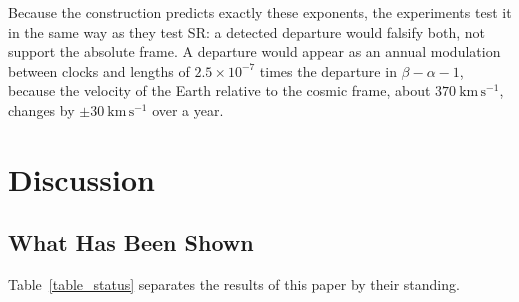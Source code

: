 \documentclass{iopjournal}
\begin{document}
Because the construction predicts exactly these exponents, the experiments test it in the same way as they test SR: a detected departure would falsify both, not support the absolute frame. A departure would appear as an annual modulation between clocks and lengths of $2.5\times10^{-7}$ times the departure in $\beta-\alpha-1$, because the velocity of the Earth relative to the cosmic frame, about $370~\mathrm{km\,s^{-1}}$, changes by $\pm30~\mathrm{km\,s^{-1}}$ over a year.

\section{Discussion}\label{sec_discussion}

\subsection{What Has Been Shown}\label{sec_what_it_is}

Table~\ref{table_status} separates the results of this paper by their standing.
\end{document}
